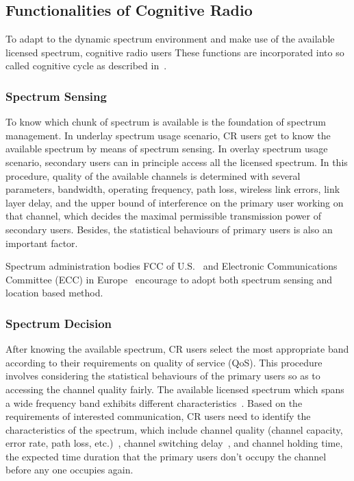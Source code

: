 \subsection{Functionalities of Cognitive Radio}
To adapt to the dynamic spectrum environment and make use of the available licensed spectrum, cognitive radio users %
These functions are incorporated into so called cognitive cycle as described in~\cite{Akyildiz09}.

\subsubsection{Spectrum Sensing}
To know which chunk of spectrum is available is the foundation of spectrum management.
In underlay spectrum usage scenario, CR users get to know the available spectrum by means of spectrum sensing.
In overlay spectrum usage scenario, secondary users can in principle access all the licensed spectrum.
In this procedure, quality of the available channels is determined with several parameters, \ie bandwidth, operating frequency, path loss, wireless link errors, link layer delay, and the upper bound of interference on the primary user working on that channel, which decides the maximal permissible transmission power of secondary users.
Besides, the statistical behaviours of primary users is also an important factor.

Spectrum administration bodies FCC of U.S.~\cite{FCC_2010_sedond_memorandumm} and Electronic Communications Committee (\gls{ECC}) in Europe~\cite{ecc159} encourage to adopt both spectrum sensing and location based method.

\subsubsection{Spectrum Decision}
After knowing the available spectrum, CR users select the most appropriate band according to their requirements on quality of service (QoS).
This procedure involves considering the statistical behaviours of the primary users so as to accessing the channel quality fairly.
The available licensed spectrum which spans a wide frequency band exhibits different characteristics~\cite{spectrum_decision_TMC11}.
Based on the requirements of interested communication, CR users need to identify the characteristics of the spectrum, which include channel quality (channel capacity, error rate, path loss, etc.)~\cite{spectrum_decision_TMC11}, channel switching delay~\cite{channel_switch_delay11}, and channel holding time, \ie the expected time duration that the primary users don't occupy the channel before any one occupies again.

